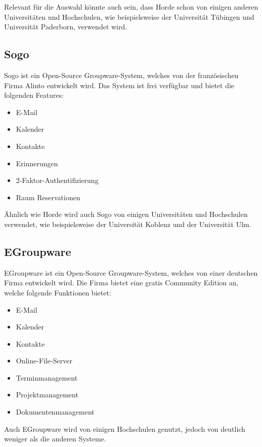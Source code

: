 Relevant für die Auswahl könnte auch sein, dass Horde schon von einigen anderen Universitäten und Hochschulen, wie beispielsweise der Universität Tübingen und Universität Paderborn, verwendet wird.

\subsection{Sogo}

Sogo ist ein Open-Source Groupware-System, welches von der französischen Firma Alinto entwickelt wird.
Das System ist frei verfügbar und bietet die folgenden Features:

\begin{itemize}
    \item E-Mail
    \item Kalender
    \item Kontakte
    \item Erinnerungen
    \item 2-Faktor-Authentifizierung
    \item Raum Reservationen
\end{itemize}
\autocite[Quelle:][]{sogo}

Ähnlich wie Horde wird auch Sogo von einigen Universitäten und Hochschulen verwendet, wie beispielsweise der Universität Koblenz und der Universität Ulm.

\subsection{EGroupware}

EGroupware ist ein Open-Source Groupware-System, welches von einer deutschen Firma entwickelt wird.
Die Firma bietet eine gratis Community Edition an, welche folgende Funktionen bietet:

\begin{itemize}
    \item E-Mail
    \item Kalender
    \item Kontakte
    \item Online-File-Server
    \item Terminmanagement
    \item Projektmanagement
    \item Dokumentenmanagement
\end{itemize}

Auch EGroupware wird von einigen Hochschulen genutzt, jedoch von deutlich weniger als die anderen Systeme.


